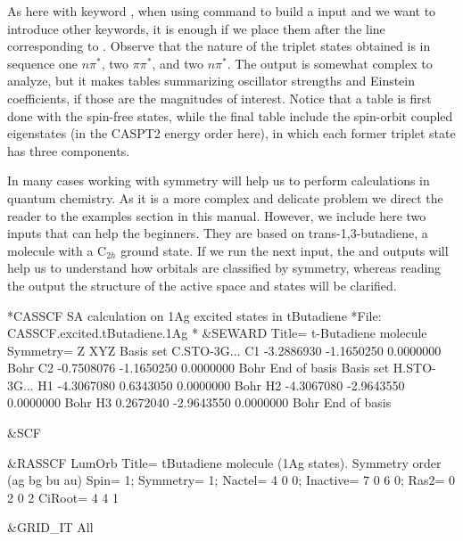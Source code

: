 As here with keyword , 
when using command  to build a  input
and we want to introduce other keywords, it is enough if we place them
after the line corresponding to .
Observe that the nature of the triplet states obtained is in sequence one
$n\pi^*$, two $\pi\pi^*$, and two $n\pi^*$. The  output is 
somewhat complex to analyze, but it makes tables summarizing oscillator 
strengths and Einstein coefficients, if those are the magnitudes of interest. 
Notice that a table is first done with the spin-free states, while the final 
table include the spin-orbit coupled eigenstates (in the CASPT2 energy order 
here), in which each former triplet state has three components.

In many cases working with symmetry will help us to perform calculations
in quantum chemistry. As it is a more complex and delicate problem we direct
the reader to the examples section in this manual. However, we include here
two inputs that can help the beginners. They are based on trans-1,3-butadiene,
a molecule with a C$_{2h}$ ground state. If we run the next input, the
 and  outputs will help us to understand how
orbitals are classified by symmetry, whereas reading the  output
the structure of the active space and states will be clarified.

\begin{inputlisting}
*CASSCF SA calculation on 1Ag excited states in tButadiene
*File: CASSCF.excited.tButadiene.1Ag
*
&SEWARD 
  Title= t-Butadiene molecule
  Symmetry= Z XYZ
Basis set
C.STO-3G...
C1   -3.2886930 -1.1650250 0.0000000  Bohr
C2   -0.7508076 -1.1650250 0.0000000  Bohr
End of basis
Basis set
H.STO-3G...
H1   -4.3067080  0.6343050 0.0000000  Bohr
H2   -4.3067080 -2.9643550 0.0000000  Bohr
H3    0.2672040 -2.9643550 0.0000000  Bohr
End of basis
                                                                                                                                                                            
&SCF 
                                                                                                                                                                            
&RASSCF 
 LumOrb
 Title= tButadiene molecule (1Ag states). Symmetry order (ag bg bu au)
 Spin= 1; Symmetry= 1; Nactel= 4 0 0; Inactive= 7 0 6 0; Ras2= 0 2 0 2
 CiRoot= 4 4 1

&GRID_IT 
 All
\end{inputlisting}

